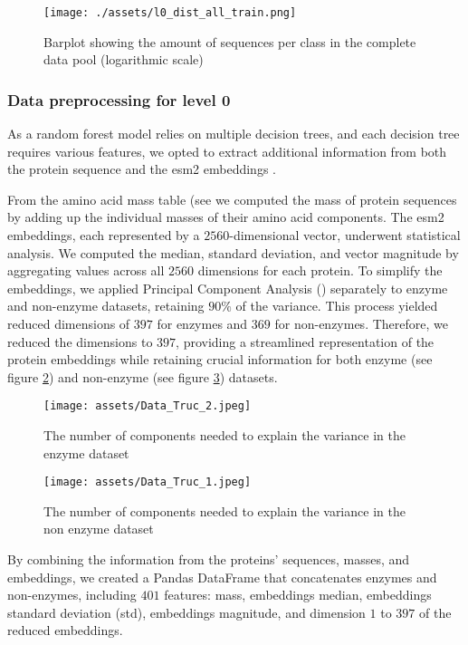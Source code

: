 \documentclass{bioinfo}
\begin{document}
\begin{methods}
\begin{figure}[!htbp]
\texttt{[image: ./assets/l0\_dist\_all\_train.png]}
\caption{Barplot showing the amount of sequences per class in the complete data pool (logarithmic scale)}\label{fig:DataPoolDist}
\end{figure}

\subsubsection{Data preprocessing for level 0}
As a random forest model relies on multiple decision trees, and each decision tree requires various features,
we opted to extract additional information from both the protein sequence and the esm2 embeddings \cite{ESM2}.

From the amino acid mass table (see \cite{BioinformaticsSolutionsInc}
we computed the mass of protein sequences by adding up the individual masses of their amino acid components.
The esm2 embeddings, each represented by a $2560$-dimensional vector, underwent statistical analysis.
We computed the median, standard deviation, and vector magnitude by aggregating values across all $2560$ dimensions for each protein.
To simplify the embeddings, we applied Principal Component Analysis (\cite{scikit-learn})
separately to enzyme and non-enzyme datasets,
retaining $90\%$ of the variance. This process yielded reduced dimensions of $397$ for enzymes and $369$ for non-enzymes. 
Therefore, we reduced the dimensions to $397$, providing a streamlined representation of the protein embeddings while retaining crucial information for both 
enzyme (see figure \ref{fig:PCA_enzymes}) and non-enzyme (see figure \ref{fig:PCA_nonEnzymes}) datasets.

\begin{figure}[!bp]
\texttt{[image: assets/Data\_Truc\_2.jpeg]}
\caption{The number of components needed to explain the variance in the enzyme dataset}\label{fig:PCA_enzymes}
\end{figure}

\begin{figure}[!tbp]
\texttt{[image: assets/Data\_Truc\_1.jpeg]}
\caption{The number of components needed to explain the variance in the non enzyme dataset}\label{fig:PCA_nonEnzymes}
\end{figure}


By combining the information from the proteins’ sequences, masses, and embeddings, we created a Pandas DataFrame that concatenates enzymes and non-enzymes,
including $401$ features: mass, embeddings median, embeddings standard deviation (std), embeddings magnitude, and dimension $1$ to $397$ of the reduced 
embeddings. 


\end{methods}
\end{document}
